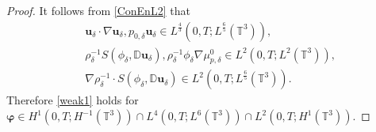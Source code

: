 \documentclass[10pt,a4paper]{amsart}
\begin{document}
			\begin{proof}
				
				It follows from \eqref{ConEnL2} that
				\begin{align*}
					&\mathbf{u}_\delta\cdot\nabla\mathbf{u}_\delta, p_{0,\delta} \mathbf{u}_\delta\in L^\frac{4}{3}(0,T;L^{\frac{6}{5}}(\mathbb{T}^3)),
					\\& \rho_\delta^{-1}S(\phi_{\delta},\mathbb{ D}\mathbf{u}_\delta),\rho_\delta^{-1}\phi_\delta \nabla \mu_{p,\delta}^{0}\in L^2(0,T;L^{2}(\mathbb{T}^3)),
					\\& \nabla\rho_\delta^{-1}\cdot S(\phi_\delta,\mathbb{ D}\mathbf{u}_\delta)\in L^2(0,T;L^{\frac{6}{5}}(\mathbb{T}^3)).
				\end{align*}
				Therefore  \eqref{weak1} holds for  $\boldsymbol{\varphi}\in  H^1(0,T;H^{-1}(\mathbb{T}^3))\cap L^4(0,T;L^{6}(\mathbb{T}^3))\cap L^2(0,T;H^{1}(\mathbb{T}^3))$.
				

\end{proof}
\end{document}
